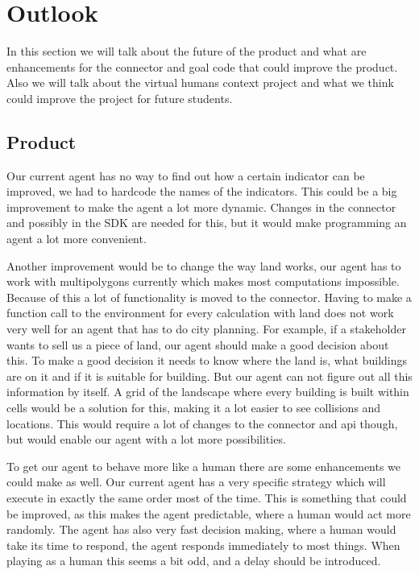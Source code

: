 \chapter{Outlook}
In this section we will talk about the future of the product and what are enhancements for the connector and goal code that could improve the product. Also we will talk about the virtual humans context project and what we think could improve the project for future students.

\section {Product}
Our current agent has no way to find out how a certain indicator can be improved, we had to hardcode the names of the indicators. This could be a big improvement to make the agent a lot more dynamic. Changes in the connector and possibly in the SDK are needed for this, but it would make programming an agent a lot more convenient.

Another improvement would be to change the way land works, our agent has to work with multipolygons currently which makes most computations impossible. Because of this a lot of functionality is moved to the connector. Having to make a function call to the environment for every calculation with land does not work very well for an agent that has to do city planning. For example, if a stakeholder wants to sell us a piece of land, our agent should make a good decision about this. To make a good decision it needs to know where the land is, what buildings are on it and if it is suitable for building. But our agent can not figure out all this information by itself. A grid of the landscape where every building is built within cells would be a solution for this, making it a lot easier to see collisions and locations. This would require a lot of changes to the connector and api though, but would enable our agent with a lot more possibilities.

To get our agent to behave more like a human there are some enhancements we could make as well. Our current agent has a very specific strategy which will execute in exactly the same order most of the time. This is something that could be improved, as this makes the agent predictable, where a human would act more randomly. The agent has also very fast decision making, where a human would take its time to respond, the agent responds immediately to most things. When playing as a human this seems a bit odd, and a delay should be introduced.
